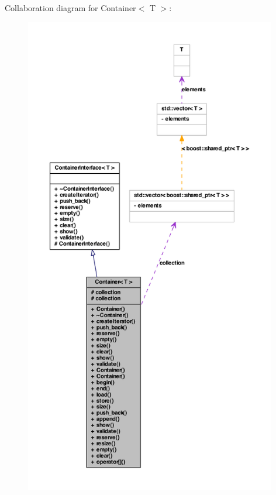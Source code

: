 Collaboration diagram for Container$<$ T $>$:
\nopagebreak
\begin{figure}[H]
\begin{center}
\leavevmode
\includegraphics[height=600pt]{class_container__coll__graph}
\end{center}
\end{figure}
